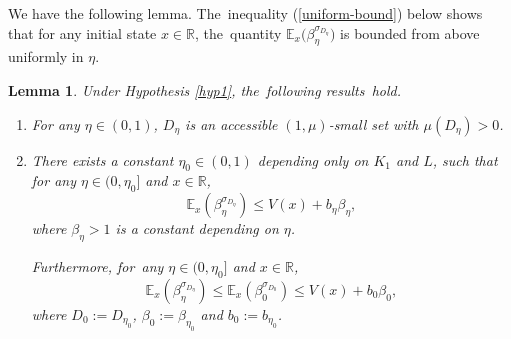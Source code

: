 \documentclass[11pt]{elsarticle}
\newtheorem{lemma}{Lemma}[section]
\def\leq{\leqslant}
\def\E{\mathbb{E}}
\def\R{\mathbb{R}}
\begin{document}
We have the following lemma. The~inequality (\ref{uniform-bound}) below shows that for any initial state $x\in \R$, the~quantity $\E_x\big(\beta_\eta^{\sigma_{D_{\eta}}}\big)$ is bounded from above uniformly in $\eta$.
\begin{lemma}\label{lem}
	Under Hypothesis \ref{hyp1}, the~following results~hold.
	\begin{enumerate}
		\item[(1)] For any $\eta\in(0,1)$, $D_{\eta}$ is an accessible $(1,\mu)$-small set with $\mu(D_{\eta})>0$.
		\item[(2)] There exists a constant $\eta_0\in(0,1)$ depending only on $K_1$ and $L$, such that for any $\eta\in(0,\eta_0]$ and $x\in\R$,
		$$\E_x\left(\beta_{\eta}^{\sigma_{D_\eta}}\right)\leq V(x)+b_{\eta}\beta_{\eta},$$
		where  $\beta_{\eta}>1$ is a constant depending on $\eta$. 
		
		Furthermore, for~any $\eta\in(0,\eta_0]$ and $x\in\R$,
		\begin{equation}\label{uniform-bound}
			\E_x\left(\beta_\eta^{\sigma_{D_{\eta}}}\right)\leq\E_x\left(\beta_{0}^{\sigma_{D_{0}}}\right)\leq  V(x)+b_{0}\beta_{0},
		\end{equation}
		where $D_0:=D_{\eta_0}$, $\beta_0:=\beta_{\eta_0}$ and $b_0:=b_{\eta_0}$.
	\end{enumerate}
\end{lemma}
\end{document}
